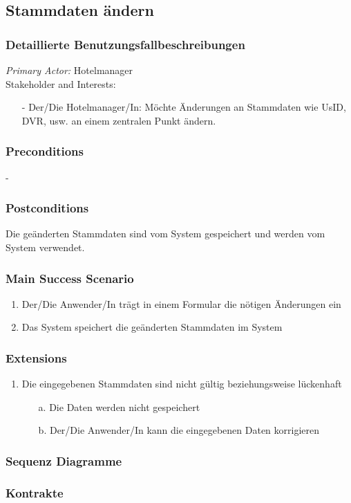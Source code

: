 \documentclass[./detailed_overview_usecases.tex]{subfiles}
\begin{document}
    \subsection{Stammdaten ändern}
    \subsubsection{Detaillierte Benutzungsfallbeschreibungen}
    \textit{Primary Actor:}
    Hotelmanager
    \\
    Stakeholder and Interests:
    \begin{itemize}
        \item[-] Der/Die Hotelmanager/In: Möchte Änderungen an Stammdaten wie UsID, DVR, usw. an  einem zentralen Punkt ändern.
    \end{itemize}

    \subsubsection*{Preconditions}
    -
    \subsubsection*{Postconditions}
    Die geänderten Stammdaten sind vom System gespeichert und werden vom System verwendet.

    \subsubsection*{Main Success Scenario}
    \begin{enumerate}
        \item Der/Die Anwender/In trägt in einem Formular die nötigen Änderungen ein
        \item Das System speichert die geänderten Stammdaten im System
    \end{enumerate}

    \subsubsection*{Extensions}
    \begin{enumerate}
        \item Die eingegebenen Stammdaten sind nicht gültig beziehungsweise lückenhaft
        \begin{itemize}
            \item[a.] Die Daten werden nicht gespeichert
            \item[b.] Der/Die Anwender/In kann die eingegebenen Daten korrigieren
        \end{itemize}
    \end{enumerate}

    \subsubsection{Sequenz Diagramme}
    \subsubsection{Kontrakte}
\end{document}
